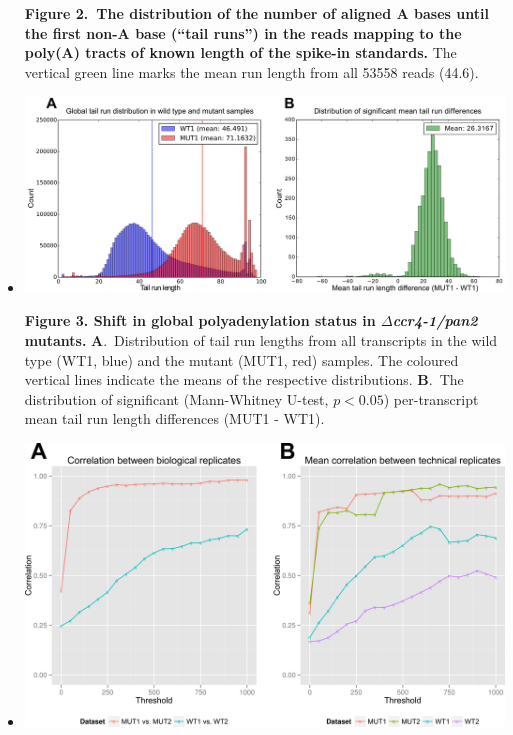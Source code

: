 \documentclass[10pt]{article}
\begin{document}
\begin{itemize}
{\textbf{Figure 2.~The distribution of the number of aligned A bases until the first non-A base (``tail runs'') in the reads mapping to the poly(A) tracts of known length of the spike-in standards.} The vertical green line marks the mean run length from all 53558 reads (44.6).}
\newpage

\item[]{
\begin{center}
\includegraphics[scale=0.9]{Figure3.png}
\end{center}

\textbf{Figure 3. Shift in global polyadenylation status in \textit{$\Delta$ccr4-1/pan2} mutants.} \textbf{A}.~Distribution of tail run lengths from all transcripts in the wild type (WT1, blue) and the mutant (MUT1, red) samples. The coloured vertical lines indicate the means of the respective distributions.
\textbf{B}.~The distribution of significant (Mann-Whitney U-test, $p < 0.05$) per-transcript mean tail run length differences (MUT1 - WT1).
}
\newpage

\item[]{
\begin{center}
\includegraphics[scale=0.9]{Figure4.png}
\end{center}

}
\end{itemize}
\end{document}
